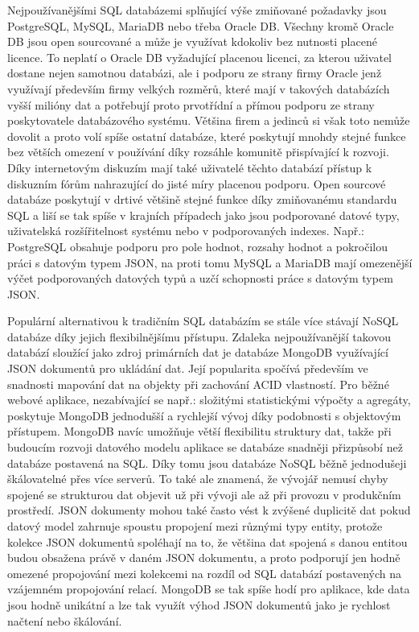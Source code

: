 \begin{itemize}
\begin{itemize}
		Nejpoužívanějšími \Ac{SQL} databázemi splňující výše zmiňované požadavky jsou PostgreSQL, MySQL, MariaDB
		nebo třeba Oracle DB.
		Všechny kromě Oracle DB jsou open sourcované a může je využívat kdokoliv bez nutnosti placené licence.
		To neplatí o Oracle DB vyžadující placenou licenci, za kterou uživatel dostane nejen samotnou databázi, ale
		i podporu ze strany firmy Oracle jenž využívají především firmy velkých rozměrů, které mají v takových databázích
		vyšší milióny dat a potřebují proto prvotřídní a přímou podporu ze strany poskytovatele databázového systému.
		Většina firem a jedinců si však toto nemůže dovolit a proto volí spíše ostatní databáze, které poskytují mnohdy
		stejné funkce bez větších omezení v používání díky rozsáhle komunitě přispívající k rozvoji.
		Díky internetovým diskuzím mají také uživatelé těchto databází přístup k diskuzním fórům nahrazující do jisté míry
		placenou podporu.
		Open sourcové databáze poskytují v drtivé většině stejné funkce díky zmiňovanému standardu \Ac{SQL} a
		liší se tak spíše v krajních případech jako jsou podporované datové typy, uživatelská rozšířitelnost systému
		nebo v podporovaných indexes.
		Např.: PostgreSQL obsahuje podporu pro pole hodnot, rozsahy hodnot a pokročilou práci s datovým typem \Ac{JSON},
		na proti tomu MySQL a MariaDB mají omezenější výčet podporovaných datových typů a uzčí schopnosti práce s datovým
		typem \Ac{JSON}.

		Populární alternativou k tradičním \Ac{SQL} databázím se stále více stávají \Ac{NoSQL} databáze
		díky jejich flexibilnějšímu přístupu.
		Zdaleka nejpoužívanější takovou databází sloužící jako zdroj primárních dat je databáze MongoDB využívající
		\Ac{JSON} dokumentů pro ukládání dat.
		Její popularita spočívá především ve snadnosti mapování dat na objekty při zachování \Ac{ACID} vlastností.
		Pro běžné webové aplikace, nezabívající se např.: složitými statistickými výpočty a agregáty, poskytuje MongoDB
		jednodušší a rychlejší vývoj díky podobnosti s objektovým přístupem.
		MongoDB navíc umožňuje větší flexibilitu struktury dat, takže při budoucím rozvoji datového modelu aplikace se
		databáze snadněji přizpůsobí než databáze postavená na \Ac{SQL}.
		Díky tomu jsou databáze \Ac{NoSQL} běžně jednodušeji škálovatelné přes více serverů.\cite{when_to_use_nosql}
		To také ale znamená, že vývojář nemusí chyby spojené se strukturou dat objevit už při vývoji ale až při provozu
		v produkčním prostředí.
		\Ac{JSON} dokumenty mohou také často vést k zvýšené duplicitě dat pokud datový model zahrnuje spoustu
		propojení mezi různými typy entity, protože kolekce \Ac{JSON} dokumentů spoléhají na to, že většina dat
		spojená s danou entitou budou obsažena právě v daném \Ac{JSON} dokumentu, a proto podporují jen hodně
		omezené propojování mezi kolekcemi na rozdíl od \Ac{SQL} databází postavených na vzájemném propojování
		relací.
		MongoDB se tak spíše hodí pro aplikace, kde data jsou hodně unikátní a lze tak využít výhod \Ac{JSON}
		dokumentů jako je rychlost načtení nebo škálování.\cite{why_you_should_never_use_mongodb}


\end{itemize}
\end{itemize}
